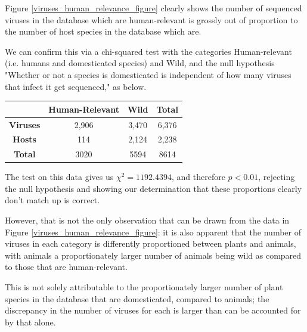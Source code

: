 \documentclass[12pt]{article}
\begin{document}
    Figure \ref{viruses_human_relevance_figure} clearly shows the number of
    sequenced viruses in the database which are human-relevant is grossly out
    of proportion to the number of host species in the database which are.

    We can confirm this via a chi-squared test with the categories Human-relevant
    (i.e. humans and domesticated species) and Wild, and the null hypothesis
    "Whether or not a species is domesticated is independent of how many viruses
    that infect it get sequenced," as below.

    \begin{table}[H]
        \begin{tabular}{|c|c|c|c|}
        \hline
                         & \textbf{Human-Relevant} & \textbf{Wild} & \textbf{Total} \\ \hline
        \textbf{Viruses} & 2,906                   & 3,470         & 6,376          \\ \hline
        \textbf{Hosts}   & 114                     & 2,124         & 2,238          \\ \hline
        \textbf{Total}   & 3020                    & 5594          & 8614           \\ \hline
        \end{tabular}
    \end{table}

    The test on this data gives us $\chi^2 = 1192.4394$, and therefore $p < 0.01$,
    rejecting the null hypothesis and showing our determination that these proportions
    clearly don't match up is correct.

    However, that is not the only observation that can be drawn from the data in
    Figure \ref{viruses_human_relevance_figure}: it is also apparent that the number
    of viruses in each category is differently proportioned between plants and
    animals, with animals a proportionately larger number of animals being wild
    as compared to those that are human-relevant.

    This is not solely attributable to the proportionately larger number of
    plant species in the database that are domesticated, compared to animals;
    the discrepancy in the number of viruses for each is larger than can be
    accounted for by that alone.
\end{document}
